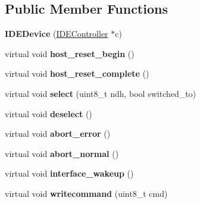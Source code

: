 \subsection*{Public Member Functions}
\begin{DoxyCompactItemize}
\item 
\hypertarget{classIDEDevice_a8ec60d235286dcee68bb501be40db957}{{\bfseries I\-D\-E\-Device} (\hyperlink{classIDEController}{I\-D\-E\-Controller} $\ast$c)}\label{classIDEDevice_a8ec60d235286dcee68bb501be40db957}

\item 
\hypertarget{classIDEDevice_aedf3e1b226a8667638cc38d5a016e455}{virtual void {\bfseries host\-\_\-reset\-\_\-begin} ()}\label{classIDEDevice_aedf3e1b226a8667638cc38d5a016e455}

\item 
\hypertarget{classIDEDevice_aab6f8a2b30a35f9fab803473dfc3858c}{virtual void {\bfseries host\-\_\-reset\-\_\-complete} ()}\label{classIDEDevice_aab6f8a2b30a35f9fab803473dfc3858c}

\item 
\hypertarget{classIDEDevice_a598223ec9b78d7348468a04c6ed3c1fe}{virtual void {\bfseries select} (uint8\-\_\-t ndh, bool switched\-\_\-to)}\label{classIDEDevice_a598223ec9b78d7348468a04c6ed3c1fe}

\item 
\hypertarget{classIDEDevice_ac71d2e0b0d9a05e8b67848693e45b435}{virtual void {\bfseries deselect} ()}\label{classIDEDevice_ac71d2e0b0d9a05e8b67848693e45b435}

\item 
\hypertarget{classIDEDevice_a07ae0cbf525483cf90db95b108c6cc3b}{virtual void {\bfseries abort\-\_\-error} ()}\label{classIDEDevice_a07ae0cbf525483cf90db95b108c6cc3b}

\item 
\hypertarget{classIDEDevice_a090c375b2dda68b077e2bc7070d38348}{virtual void {\bfseries abort\-\_\-normal} ()}\label{classIDEDevice_a090c375b2dda68b077e2bc7070d38348}

\item 
\hypertarget{classIDEDevice_ae1d168e093d8c2482d9b6fdb957d2018}{virtual void {\bfseries interface\-\_\-wakeup} ()}\label{classIDEDevice_ae1d168e093d8c2482d9b6fdb957d2018}

\item 
\hypertarget{classIDEDevice_a552f00a479cad1e423dc789f50d89faf}{virtual void {\bfseries writecommand} (uint8\-\_\-t cmd)}\label{classIDEDevice_a552f00a479cad1e423dc789f50d89faf}


\end{DoxyCompactItemize}
